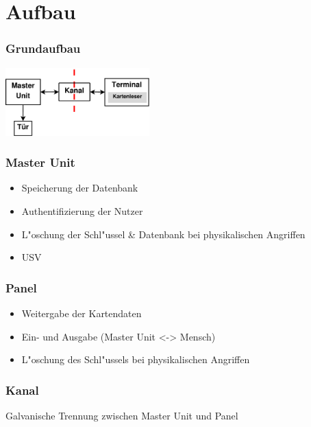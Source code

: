 \section{Aufbau}
\begin{frame}
	\frametitle{Grundaufbau}
	\begin{center}
		\includegraphics[width=210px]{grundaufbau}
	\end{center}
\end{frame}

\begin{frame}
	\frametitle{Master Unit}
	\begin{itemize}
		\item<2-> Speicherung der Datenbank
		\item<3-> Authentifizierung der Nutzer
		\item<4-> L"oschung der Schl"ussel \& Datenbank bei physikalischen Angriffen
		\item<5-> USV
	\end{itemize}
\end{frame}

\begin{frame}
	\frametitle{Panel}
	\begin{itemize}
		\item<2-> Weitergabe der Kartendaten
		\item<3-> Ein- und Ausgabe \small{(Master Unit <-> Mensch)}
		\item<4-> L"oschung des Schl"ussels bei physikalischen Angriffen
	\end{itemize}
\end{frame}

\begin{frame}
	\frametitle{Kanal}
	Galvanische Trennung zwischen Master Unit und Panel
\end{frame}
